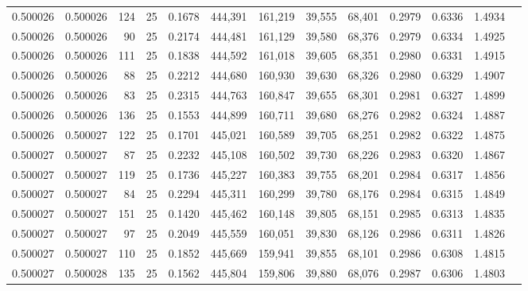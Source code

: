 \begin{tabular}{rrrrrrrrrrrrr}
0.500026 & 0.500026 &   124 &  25 &                                     0.1678 & 444,391 & 161,219 &  39,555 &  68,401 & 0.2979 & 0.6336 & 1.4934 \\
0.500026 & 0.500026 &    90 &  25 &                                     0.2174 & 444,481 & 161,129 &  39,580 &  68,376 & 0.2979 & 0.6334 & 1.4925 \\
0.500026 & 0.500026 &   111 &  25 &                                     0.1838 & 444,592 & 161,018 &  39,605 &  68,351 & 0.2980 & 0.6331 & 1.4915 \\
0.500026 & 0.500026 &    88 &  25 &                                     0.2212 & 444,680 & 160,930 &  39,630 &  68,326 & 0.2980 & 0.6329 & 1.4907 \\
0.500026 & 0.500026 &    83 &  25 &                                     0.2315 & 444,763 & 160,847 &  39,655 &  68,301 & 0.2981 & 0.6327 & 1.4899 \\
0.500026 & 0.500026 &   136 &  25 &                                     0.1553 & 444,899 & 160,711 &  39,680 &  68,276 & 0.2982 & 0.6324 & 1.4887 \\
0.500026 & 0.500027 &   122 &  25 &                                     0.1701 & 445,021 & 160,589 &  39,705 &  68,251 & 0.2982 & 0.6322 & 1.4875 \\
0.500027 & 0.500027 &    87 &  25 &                                     0.2232 & 445,108 & 160,502 &  39,730 &  68,226 & 0.2983 & 0.6320 & 1.4867 \\
0.500027 & 0.500027 &   119 &  25 &                                     0.1736 & 445,227 & 160,383 &  39,755 &  68,201 & 0.2984 & 0.6317 & 1.4856 \\
0.500027 & 0.500027 &    84 &  25 &                                     0.2294 & 445,311 & 160,299 &  39,780 &  68,176 & 0.2984 & 0.6315 & 1.4849 \\
0.500027 & 0.500027 &   151 &  25 &                                     0.1420 & 445,462 & 160,148 &  39,805 &  68,151 & 0.2985 & 0.6313 & 1.4835 \\
0.500027 & 0.500027 &    97 &  25 &                                     0.2049 & 445,559 & 160,051 &  39,830 &  68,126 & 0.2986 & 0.6311 & 1.4826 \\
0.500027 & 0.500027 &   110 &  25 &                                     0.1852 & 445,669 & 159,941 &  39,855 &  68,101 & 0.2986 & 0.6308 & 1.4815 \\
0.500027 & 0.500028 &   135 &  25 &                                     0.1562 & 445,804 & 159,806 &  39,880 &  68,076 & 0.2987 & 0.6306 & 1.4803 \\

\end{tabular}
